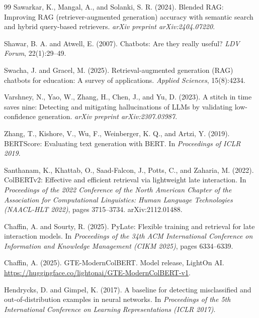 \documentclass[a4paper,twoside]{article}
\begin{document}
{\begin{thebibliography}{99}
 Sawarkar, K., Mangal, A., and Solanki, S. R. (2024). Blended RAG: Improving RAG (retriever-augmented generation) accuracy with semantic search and hybrid query-based retrievers. \textit{arXiv preprint arXiv:2404.07220}.

 Shawar, B. A. and Atwell, E. (2007). Chatbots: Are they really useful? \textit{LDV Forum}, 22(1):29--49.

 Swacha, J. and Gracel, M. (2025). Retrieval-augmented generation (RAG) chatbots for education: A survey of applications. \textit{Applied Sciences}, 15(8):4234.

 Varshney, N., Yao, W., Zhang, H., Chen, J., and Yu, D. (2023). A stitch in time saves nine: Detecting and mitigating hallucinations of LLMs by validating low-confidence generation. \textit{arXiv preprint arXiv:2307.03987}.

 Zhang, T., Kishore, V., Wu, F., Weinberger, K. Q., and Artzi, Y. (2019). BERTScore: Evaluating text generation with BERT. In \textit{Proceedings of ICLR 2019}.

 Santhanam, K., Khattab, O., Saad-Falcon, J., Potts, C., and Zaharia, M. (2022). ColBERTv2: Effective and efficient retrieval via lightweight late interaction. In \textit{Proceedings of the 2022 Conference of the North American Chapter of the Association for Computational Linguistics: Human Language Technologies (NAACL-HLT 2022)}, pages 3715--3734. arXiv:2112.01488.

 Chaffin, A. and Sourty, R. (2025). PyLate: Flexible training and retrieval for late interaction models. In \textit{Proceedings of the 34th ACM International Conference on Information and Knowledge Management (CIKM 2025)}, pages 6334--6339.

 Chaffin, A. (2025). GTE-ModernColBERT. Model release, LightOn AI. \url{https://huggingface.co/lightonai/GTE-ModernColBERT-v1}.

 Hendrycks, D. and Gimpel, K. (2017). A baseline for detecting misclassified and out-of-distribution examples in neural networks. In \textit{Proceedings of the 5th International Conference on Learning Representations (ICLR 2017)}.


\end{thebibliography}}
\end{document}
